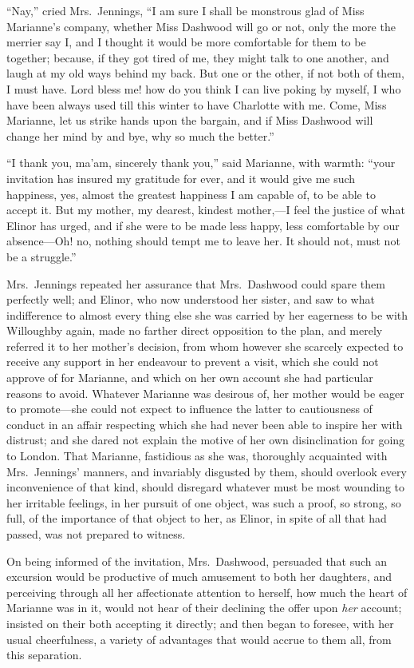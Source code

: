 \documentclass{article}
\begin{document}
``Nay,'' cried Mrs.\ Jennings, ``I am sure I shall be
monstrous glad of Miss Marianne's company, whether Miss
Dashwood will go or not, only the more the merrier say I,
and I thought it would be more comfortable for them to
be together; because, if they got tired of me, they might talk
to one another, and laugh at my old ways behind my back.
But one or the other, if not both of them, I must have.
Lord bless me! how do you think I can live poking by myself,
I who have been always used till this winter to have
Charlotte with me.  Come, Miss Marianne, let us strike
hands upon the bargain, and if Miss Dashwood will change
her mind by and bye, why so much the better.''

``I thank you, ma'am, sincerely thank you,'' said Marianne,
with warmth: ``your invitation has insured my gratitude for ever,
and it would give me such happiness, yes, almost the greatest
happiness I am capable of, to be able to accept it.
But my mother, my dearest, kindest mother,---I feel the
justice of what Elinor has urged, and if she were to be
made less happy, less comfortable by our absence---Oh! no,
nothing should tempt me to leave her.  It should not,
must not be a struggle.''

Mrs.\ Jennings repeated her assurance that Mrs.\ Dashwood
could spare them perfectly well; and Elinor, who now
understood her sister, and saw to what indifference to
almost every thing else she was carried by her eagerness
to be with Willoughby again, made no farther direct
opposition to the plan, and merely referred it to her
mother's decision, from whom however she scarcely expected
to receive any support in her endeavour to prevent a visit,
which she could not approve of for Marianne, and which
on her own account she had particular reasons to avoid.
Whatever Marianne was desirous of, her mother would be eager
to promote---she could not expect to influence the latter
to cautiousness of conduct in an affair respecting which she
had never been able to inspire her with distrust; and she
dared not explain the motive of her own disinclination
for going to London.  That Marianne, fastidious as she was,
thoroughly acquainted with Mrs.\ Jennings' manners,
and invariably disgusted by them, should overlook every
inconvenience of that kind, should disregard whatever
must be most wounding to her irritable feelings, in her
pursuit of one object, was such a proof, so strong,
so full, of the importance of that object to her, as Elinor,
in spite of all that had passed, was not prepared to witness.

On being informed of the invitation, Mrs.\ Dashwood,
persuaded that such an excursion would be productive
of much amusement to both her daughters, and perceiving
through all her affectionate attention to herself,
how much the heart of Marianne was in it, would not hear
of their declining the offer upon \emph{her} account; insisted on
their both accepting it directly; and then began to foresee,
with her usual cheerfulness, a variety of advantages that
would accrue to them all, from this separation.
\end{document}
